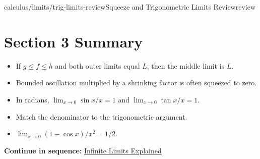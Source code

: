 \documentclass[11pt,openany]{book}
\theoremstyle{bgplain}
\newcommand{\webnext}[2]{%
  \par\addvspace{1.2em}\noindent{\color{BGLine}\rule{\textwidth}{0.35pt}}\par\smallskip
  {\small\color{BGGray}\textbf{Continue in sequence:} \hyperlink{web:#1}{#2}}\par
}
\begin{document}
\begin{webpage}{calculus/limits/trig-limits-review}{Squeeze and Trigonometric Limits Review}{review}
\section*{Section 3 Summary}

\begin{bgsummary}
\begin{itemize}
  \item If \(g\le f\le h\) and both outer limits equal \(L\), then the middle limit is \(L\).
  \item Bounded oscillation multiplied by a shrinking factor is often squeezed to zero.
  \item In radians, \(\lim_{x\to0}\sin x/x=1\) and \(\lim_{x\to0}\tan x/x=1\).
  \item Match the denominator to the trigonometric argument.
  \item \(\lim_{x\to0}(1-\cos x)/x^2=1/2\).
\end{itemize}
\end{bgsummary}
\webnext{calculus/limits/infinite-limits}{Infinite Limits Explained}
\end{webpage}
\end{document}
